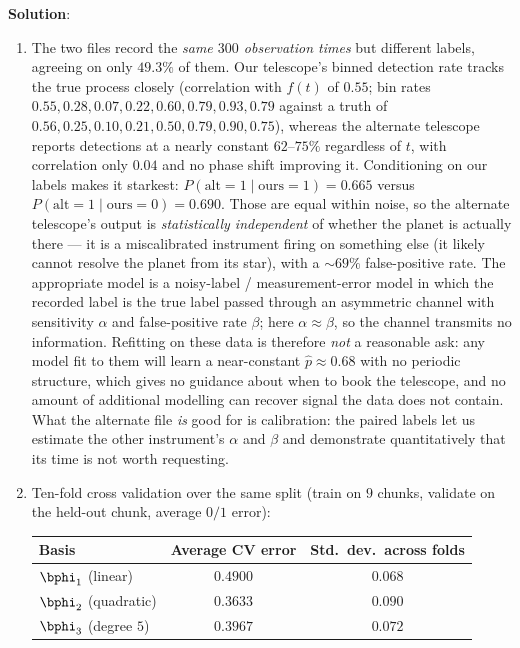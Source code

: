 \documentclass[submit]{../harvardml}
\newenvironment{solution}{
    \vspace{2mm}
    \color{blue}\noindent\textbf{Solution}:
}{}
\begin{document}
\begin{solution}
\begin{enumerate}
\item
The two files record the \emph{same $300$ observation times} but different labels,
agreeing on only $49.3\%$ of them. Our telescope's binned detection rate tracks the
true process closely (correlation with $f(t)$ of $0.55$; bin rates
$0.55, 0.28, 0.07, 0.22, 0.60, 0.79, 0.93, 0.79$ against a truth of
$0.56, 0.25, 0.10, 0.21, 0.50, 0.79, 0.90, 0.75$), whereas the alternate telescope
reports detections at a nearly constant $62$--$75\%$ regardless of $t$, with
correlation only $0.04$ and no phase shift improving it. Conditioning on our labels
makes it starkest: $P(\text{alt}=1 \mid \text{ours}=1) = 0.665$ versus
$P(\text{alt}=1\mid\text{ours}=0) = 0.690$. Those are equal within noise, so the
alternate telescope's output is \emph{statistically independent} of whether the planet
is actually there --- it is a miscalibrated instrument firing on something else
(it likely cannot resolve the planet from its star), with a $\sim\!69\%$
false-positive rate. The appropriate model is a noisy-label / measurement-error model
in which the recorded label is the true label passed through an asymmetric channel
with sensitivity $\alpha$ and false-positive rate $\beta$; here $\alpha \approx \beta$,
so the channel transmits no information. Refitting on these data is therefore
\emph{not} a reasonable ask: any model fit to them will learn a near-constant
$\hat p \approx 0.68$ with no periodic structure, which gives no guidance about when
to book the telescope, and no amount of additional modelling can recover signal the
data does not contain. What the alternate file \emph{is} good for is calibration: the
paired labels let us estimate the other instrument's $\alpha$ and $\beta$ and
demonstrate quantitatively that its time is not worth requesting.

\item
Ten-fold cross validation over the same split (train on $9$ chunks, validate on the
held-out chunk, average $0/1$ error):
\begin{center}
\begin{tabular}{lcc}
  \hline
  Basis & Average CV error & Std.\ dev.\ across folds \\
  \hline
  $\bphi_1$ (linear)     & $0.4900$          & $0.068$ \\
  $\bphi_2$ (quadratic)  & $\mathbf{0.3633}$ & $0.090$ \\
  $\bphi_3$ (degree $5$) & $0.3967$          & $0.072$ \\
  \hline
\end{tabular}
\end{center}


\end{enumerate}
\end{solution}
\end{document}
